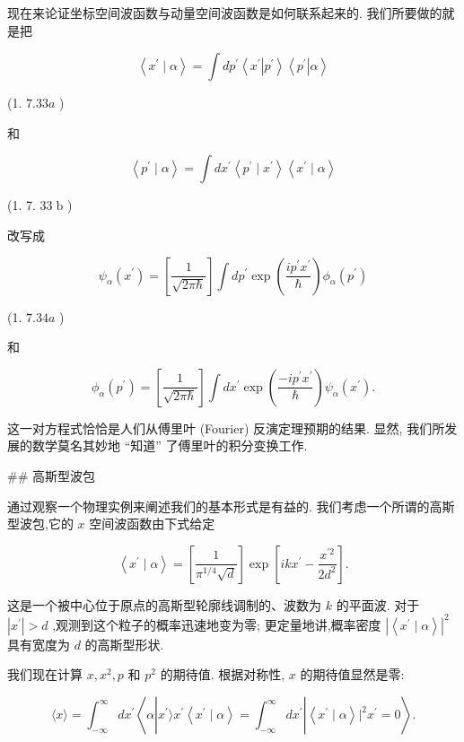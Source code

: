 \documentclass[lang=cn,newtx,10pt,scheme=chinese,thmcnt=section]{elegantbook}
\begin{document}
现在来论证坐标空间波函数与动量空间波函数是如何联系起来的. 我们所要做的就是把

$$
\left\langle {{x}^{\prime } \mid \alpha }\right\rangle = \int d{p}^{\prime }\left\langle {{x}^{\prime }\left| {p}^{\prime }\right\rangle \left\langle {p}^{\prime }\right| \alpha }\right\rangle
$$

(1. ${7.33a}$ )

和

$$
\left\langle {{p}^{\prime } \mid \alpha }\right\rangle = \int d{x}^{\prime }\left\langle {{p}^{\prime } \mid {x}^{\prime }}\right\rangle \left\langle {{x}^{\prime } \mid \alpha }\right\rangle
$$

(1. 7. ${33}\mathrm{\;b}$ )

改写成

$$
{\psi }_{\alpha }\left( {x}^{\prime }\right) = \left\lbrack \frac{1}{\sqrt{{2\pi }\hbar }}\right\rbrack \int d{p}^{\prime }\exp \left( \frac{i{p}^{\prime }{x}^{\prime }}{\hbar }\right) {\phi }_{\alpha }\left( {p}^{\prime }\right)
$$

(1. ${7.34a}$ )

和

$$
{\phi }_{\alpha }\left( {p}^{\prime }\right) = \left\lbrack \frac{1}{\sqrt{{2\pi }\hbar }}\right\rbrack \int d{x}^{\prime }\exp \left( \frac{-i{p}^{\prime }{x}^{\prime }}{\hbar }\right) {\psi }_{\alpha }\left( {x}^{\prime }\right) . \tag{1. 7.34b}
$$

这一对方程式恰恰是人们从傅里叶 (Fourier) 反演定理预期的结果. 显然, 我们所发展的数学莫名其妙地 “知道” 了傅里叶的积分变换工作.

## 高斯型波包

通过观察一个物理实例来阐述我们的基本形式是有益的. 我们考虑一个所谓的高斯型波包,它的 $x$ 空间波函数由下式给定

$$
\left\langle {{x}^{\prime } \mid \alpha }\right\rangle = \left\lbrack \frac{1}{{\pi }^{1/4}\sqrt{d}}\right\rbrack \exp \left\lbrack {{ik}{x}^{\prime } - \frac{{x}^{\prime 2}}{2{d}^{2}}}\right\rbrack . \tag{1. 7.35}
$$

这是一个被中心位于原点的高斯型轮廓线调制的、波数为 $k$ 的平面波. 对于 $\left| {x}^{\prime }\right| > d$ ,观测到这个粒子的概率迅速地变为零; 更定量地讲,概率密度 ${\left| \left\langle {x}^{\prime } \mid \alpha \right\rangle \right| }^{2}$ 具有宽度为 $d$ 的高斯型形状.

我们现在计算 $x,{x}^{2}, p$ 和 ${p}^{2}$ 的期待值. 根据对称性, $x$ 的期待值显然是零:

$$
\langle x\rangle = {\int }_{-\infty }^{\infty }d{x}^{\prime }\left\langle {\alpha \left| {{x}^{\prime }\rangle {x}^{\prime }\left\langle {{x}^{\prime } \mid \alpha }\right\rangle = {\int }_{-\infty }^{\infty }d{x}^{\prime }}\right| \left\langle {{x}^{\prime } \mid \alpha }\right\rangle {\left. \right| }^{2}{x}^{\prime } = 0}\right\rangle . \tag{1. 7.36}
$$
\end{document}
